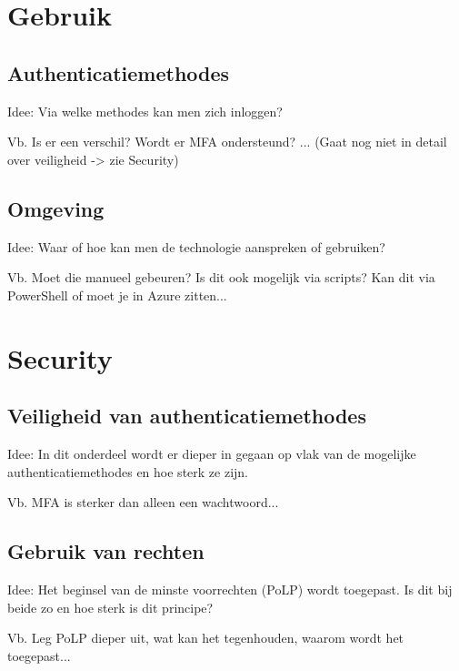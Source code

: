 \section{Gebruik}

\subsection{Authenticatiemethodes}

Idee: Via welke methodes kan men zich inloggen? 

Vb. Is er een verschil? Wordt er MFA ondersteund? ... (Gaat nog niet in detail over veiligheid -> zie Security)

\subsection{Omgeving}

Idee: Waar of hoe kan men de technologie aanspreken of gebruiken?

Vb. Moet die manueel gebeuren? Is dit ook mogelijk via scripts? Kan dit via PowerShell of moet je in Azure zitten...


\section{Security}

\subsection{Veiligheid van authenticatiemethodes}

Idee: In dit onderdeel wordt er dieper in gegaan op vlak van de mogelijke authenticatiemethodes en hoe sterk ze zijn.

Vb. MFA is sterker dan alleen een wachtwoord...

\subsection{Gebruik van rechten}

Idee: Het beginsel van de minste voorrechten (PoLP) wordt toegepast. Is dit bij beide zo en hoe sterk is dit principe?

Vb. Leg PoLP dieper uit, wat kan het tegenhouden, waarom wordt het toegepast...

